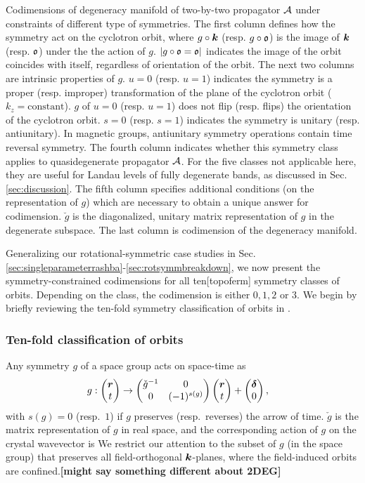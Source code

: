 \documentclass[aps, prb, showpacs, twocolumn, notitlepage, superscriptaddress]{revtex4-1}
\begin{document}
\begin{table}
\caption{Codimensions of degeneracy manifold of two-by-two propagator ${\cal A}$ under constraints of different type of symmetries. The first column defines how the symmetry act on the cyclotron orbit, where $g\circ \boldsymbol{k}$ (resp. $g\circ\mathfrak{o}$) is the image of $\boldsymbol{k}$ (resp. $\mathfrak{o}$) under the the action of $g$. $|g\circ \mathfrak{o}=\mathfrak{o}|$ indicates the image of the orbit coincides with itself, regardless of orientation of the orbit. The next two columns are intrinsic properties of $g$. $u=0$ (resp. $u=1$) indicates the symmetry is a proper (resp. improper) transformation of the plane of the cyclotron orbit ($k_z=\text{constant}$). $g$ of $u=0$ (resp. $u=1$) does not flip (resp. flips) the orientation of the cyclotron orbit. $s=0$ (resp. $s=1$) indicates the symmetry is unitary (resp. antiunitary). In magnetic groups, antiunitary symmetry operations contain time reversal symmetry. The fourth column indicates whether this symmetry class applies to quasidegenerate propagator ${\cal A}$. For the five classes not applicable here, they are useful for Landau levels of fully degenerate bands, as discussed in Sec. \ref{sec:discussion}. The fifth column specifies additional conditions (on the representation of $g$) which are necessary to obtain a unique answer for codimension. $\breve{g}$ is the diagonalized, unitary matrix representation of $g$ in the degenerate subspace. The last column is codimension of the degeneracy manifold.\label{table:codimension}}
\end{table}

Generalizing our rotational-symmetric case studies in
Sec. \ref{sec:singleparameterrashba}-\ref{sec:rotsymmbreakdown}, we now present the symmetry-constrained codimensions for all ten[topoferm] symmetry classes of orbits. Depending on the class, the codimension is either $0,1,2$ or $3$. We begin by briefly reviewing the ten-fold symmetry classification of orbits in .





\subsubsection{Ten-fold classification of orbits}

Any symmetry $g$ of a space group acts on space-time as
\begin{align}
&g: \vectwo{\br}{t} \rightarrow \matrixtwo{\check{g}^{-1}}{0}{0}{ (-1)^{s(g)}}\vectwo{\br}{t}+\vectwo{\bdelta}{0}, \la{definesg}
\end{align}
with $s(g){=}0$ (resp.\ $1$) if $g$ preserves (resp.\  reverses) the arrow of time. $\check{g}$ is the matrix representation of $g$ in real space, and the corresponding action of  $g$ on the crystal wavevector is  
We restrict our attention to the subset of $g$ (in the space group) that preserves all field-orthogonal $\boldsymbol{k}$-planes, where the field-induced orbits  are confined.\textbf{[might say something different about 2DEG]}
\end{document}
